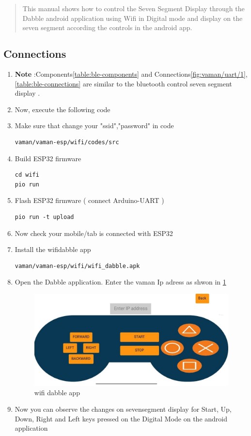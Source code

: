 \begin{abstract}
	      This manual shows how to control the Seven Segment Display through the Dabble android application using Wifi in Digital mode and display on the seven segment according the controls in the android app.
\end{abstract}



\subsection{ Connections }
\begin{enumerate}[label=\thesection.\arabic*.,ref=\thesection.\theenumi]
\item \textbf{Note} :Components\ref{table:ble-components} and  Connections\ref{fig:vaman/uart/1},\ref{table:ble-connections} are similar to the bluetooth control seven segment display .
\item Now, execute the following code
\item Make sure that change your "ssid","password" in code 
\begin{lstlisting}
vaman/vaman-esp/wifi/codes/src
\end{lstlisting}
\item Build ESP32 firmware
\begin{lstlisting}
cd wifi 
pio run 
\end{lstlisting}
\item Flash ESP32 firmware ( connect Arduino-UART  )
\begin{lstlisting}
pio run -t upload
\end{lstlisting}
\item Now check your mobile/tab is connected with ESP32 
\item Install the wifidabble app
\begin{lstlisting}
vaman/vaman-esp/wifi/wifi_dabble.apk
\end{lstlisting}

\item Open the Dabble application. Enter the vaman Ip adress as shwon in \ref{fig:dabble}
\begin{figure}[H]
\centering
\includegraphics[width=0.6\columnwidth]{figs/wifi.jpg}
\caption{wifi dabble app}
\label{fig:dabble}
\end{figure}
\item Now you can observe the changes on sevensegment display for Start, Up, Down, Right and Left keys pressed on the Digital Mode on the android application
\end{enumerate}